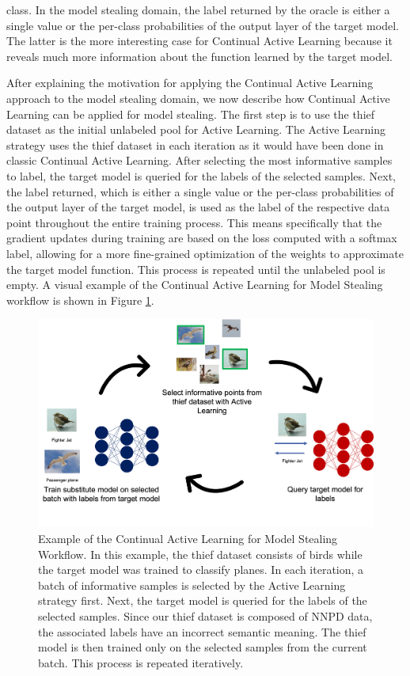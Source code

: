 class. In the model stealing domain, the label returned by the oracle is either a single value or the per-class probabilities of the output layer of the target model.
The latter is the more interesting case for Continual Active Learning because it reveals much more information about the function learned by the target model. \par
After explaining the motivation for applying the Continual Active Learning approach to the model stealing domain, we now describe how Continual Active Learning can be
applied for model stealing. The first step is to use the thief dataset as the initial unlabeled pool for Active Learning. The Active Learning
strategy uses the thief dataset in each iteration as it would have been done in classic Continual Active Learning. After selecting the most informative samples to label,
the target model is queried for the labels of the selected samples. Next, the label returned, which is either a single value or the per-class probabilities of the output
layer of the target model, is used as the label of the respective data point throughout the entire training process. This means specifically that the gradient updates during 
training are based on the loss computed with a softmax label, allowing for a more fine-grained optimization of the weights to approximate the target model function. This
process is repeated until the unlabeled pool is empty. A visual example of the Continual Active Learning for Model Stealing workflow is shown in Figure
\ref{fig:CalmsWorkflow}. \par
\begin{figure}[ht]
    \centering
    \includegraphics[width=.7\linewidth]{images/Calms_workflow.png}
    \caption[Continual Active Learning for Model Stealing Workflow]{Example of the Continual Active Learning for Model Stealing Workflow. In this example, the thief
    dataset consists of birds while the target model was trained to classify planes. In each iteration, a batch of informative samples is selected by the Active Learning
    strategy first. Next, the target model is queried for the labels of the selected samples. Since our thief dataset is composed of NNPD data, the associated labels have
    an incorrect semantic meaning. The thief model is then trained only on the selected samples from the current batch. This process is repeated iteratively.}
    \label{fig:CalmsWorkflow}
\end{figure}



